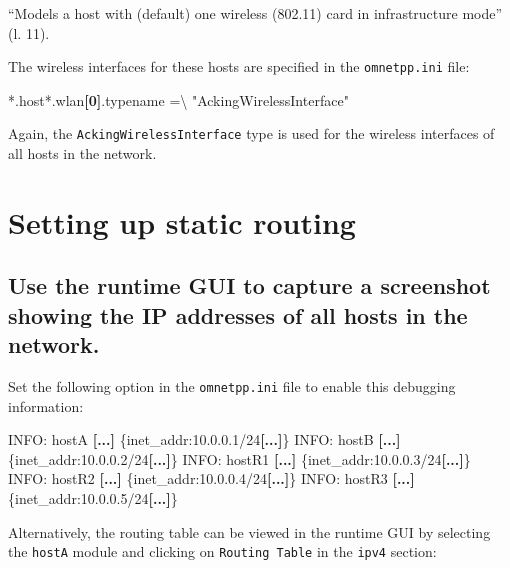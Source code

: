 \documentclass[
  letterpaper,
  DIV=11,
  numbers=noendperiod]{scrartcl}
\newenvironment{Shaded}{\begin{snugshade}}{\end{snugshade}}
\newcommand{\DataTypeTok}[1]{\textcolor[rgb]{0.68,0.00,0.00}{#1}}
\newcommand{\KeywordTok}[1]{\textcolor[rgb]{0.00,0.23,0.31}{\textbf{#1}}}
\newcommand{\OtherTok}[1]{\textcolor[rgb]{0.00,0.23,0.31}{#1}}
\newcommand{\StringTok}[1]{\textcolor[rgb]{0.13,0.47,0.30}{#1}}
\begin{document}
``Models a host with (default) one wireless (802.11) card in
infrastructure mode'' (l. 11).

The wireless interfaces for these hosts are specified in the
\texttt{omnetpp.ini} file:

\begin{Shaded}
\begin{Highlighting}[]
\DataTypeTok{*.host*.wlan}\KeywordTok{[0]}\DataTypeTok{.typename }\OtherTok{=}\StringTok{\textbackslash{}}
\DataTypeTok{  "AckingWirelessInterface"}
\end{Highlighting}
\end{Shaded}

Again, the \texttt{AckingWirelessInterface} type is used for the
wireless interfaces of all hosts in the network.

\section{Setting up static routing}\label{setting-up-static-routing}

\subsection{Use the runtime GUI to capture a screenshot showing the IP
addresses of all hosts in the
network.}\label{use-the-runtime-gui-to-capture-a-screenshot-showing-the-ip-addresses-of-all-hosts-in-the-network.}

Set the following option in the \texttt{omnetpp.ini} file to enable this
debugging information:

\begin{Shaded}
\begin{Highlighting}[]
\DataTypeTok{INFO: hostA }\KeywordTok{[...]}
\DataTypeTok{  \{inet\_addr:10.0.0.1/24}\KeywordTok{[...]}\DataTypeTok{\}}
\DataTypeTok{INFO: hostB }\KeywordTok{[...]}
\DataTypeTok{  \{inet\_addr:10.0.0.2/24}\KeywordTok{[...]}\DataTypeTok{\}}
\DataTypeTok{INFO: hostR1 }\KeywordTok{[...]}
\DataTypeTok{  \{inet\_addr:10.0.0.3/24}\KeywordTok{[...]}\DataTypeTok{\}}
\DataTypeTok{INFO: hostR2 }\KeywordTok{[...]}
\DataTypeTok{  \{inet\_addr:10.0.0.4/24}\KeywordTok{[...]}\DataTypeTok{\}}
\DataTypeTok{INFO: hostR3 }\KeywordTok{[...]}
\DataTypeTok{  \{inet\_addr:10.0.0.5/24}\KeywordTok{[...]}\DataTypeTok{\}}
\end{Highlighting}
\end{Shaded}

Alternatively, the routing table can be viewed in the runtime GUI by
selecting the \texttt{hostA} module and clicking on
\texttt{Routing\ Table} in the \texttt{ipv4} section:
\end{document}
